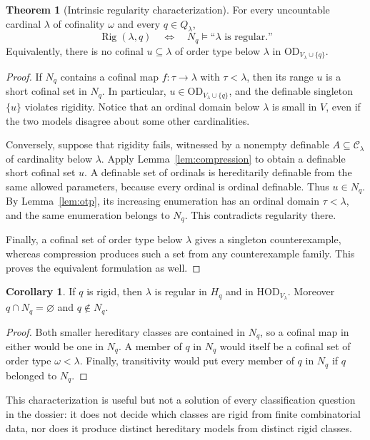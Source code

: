 \documentclass[11pt,letterpaper]{article}
\theoremstyle{definition}
\newtheorem{theorem}[definition]{Theorem}
\newtheorem{corollary}[definition]{Corollary}
\numberwithin{equation}{section}
\newcommand{\HOD}{\mathrm{HOD}}
\newcommand{\OD}{\mathrm{OD}}
\newcommand{\Clam}{\mathcal C_\lambda}
\newcommand{\Rig}{\operatorname{Rig}}
\begin{document}
\begin{theorem}[Intrinsic regularity characterization]\label{thm:rig-regular}
For every uncountable cardinal $\lambda$ of cofinality $\omega$ and every
$q\in Q_\lambda$,
\[
 \Rig(\lambda,q)
 \quad\Longleftrightarrow\quad
 N_q\models\text{``$\lambda$ is regular.''}
\]
Equivalently, there is no cofinal $u\subseteq\lambda$ of order type below
$\lambda$ in $\OD_{V_\lambda\cup\{q\}}$.
\end{theorem}
\begin{proof}
If $N_q$ contains a cofinal map $f:\tau\to\lambda$ with $\tau<\lambda$,
then its range $u$ is a short cofinal set in $N_q$. In particular,
$u\in\OD_{V_\lambda\cup\{q\}}$, and the definable singleton $\{u\}$ violates
rigidity. Notice that an ordinal domain below $\lambda$ is small in $V$,
even if the two models disagree about some other cardinalities.

Conversely, suppose that rigidity fails, witnessed by a nonempty definable
$A\subseteq\Clam$ of cardinality below $\lambda$. Apply
Lemma~\ref{lem:compression} to obtain a definable short cofinal set $u$.
A definable set of ordinals is hereditarily definable from the same allowed
parameters, because every ordinal is ordinal definable. Thus $u\in N_q$.
By Lemma~\ref{lem:otp}, its increasing enumeration has an ordinal domain
$\tau<\lambda$, and the same enumeration belongs to $N_q$. This contradicts
regularity there.

Finally, a cofinal set of order type below $\lambda$ gives a singleton
counterexample, whereas compression produces such a set from any
counterexample family. This proves the equivalent formulation as well.
\end{proof}

\begin{corollary}\label{cor:hered}
If $q$ is rigid, then $\lambda$ is regular in $H_q$ and in
$\HOD_{V_\lambda}$. Moreover $q\cap N_q=\varnothing$ and $q\notin N_q$.
\end{corollary}
\begin{proof}
Both smaller hereditary classes are contained in $N_q$, so a cofinal map
in either would be one in $N_q$. A member of $q$ in $N_q$ would itself be
a cofinal set of order type $\omega<\lambda$. Finally, transitivity would
put every member of $q$ in $N_q$ if $q$ belonged to $N_q$.
\end{proof}

This characterization is useful but not a solution of every classification
question in the dossier: it does not decide which classes are rigid from
finite combinatorial data, nor does it produce distinct hereditary models
from distinct rigid classes.
\end{document}
